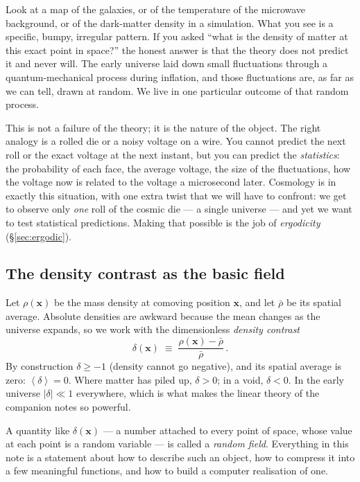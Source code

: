 \documentclass[12pt]{article}
\newcommand{\bx}{\mathbf{x}}
\newcommand{\avg}[1]{\left\langle #1 \right\rangle}
\begin{document}
Look at a map of the galaxies, or of the temperature of the microwave
background, or of the dark-matter density in a simulation.  What you see
is a specific, bumpy, irregular pattern.  If you asked ``what is the
density of matter at this exact point in space?'' the honest answer is
that the theory does not predict it and never will.  The early universe
laid down small fluctuations through a quantum-mechanical process during
inflation, and those fluctuations are, as far as we can tell, drawn at
random.  We live in one particular outcome of that random process.

This is not a failure of the theory; it is the nature of the object.
The right analogy is a rolled die or a noisy voltage on a wire.  You
cannot predict the next roll or the exact voltage at the next instant,
but you can predict the \emph{statistics}: the probability of each face,
the average voltage, the size of the fluctuations, how the voltage now
is related to the voltage a microsecond later.  Cosmology is in exactly
this situation, with one extra twist that we will have to confront: we
get to observe only \emph{one} roll of the cosmic die --- a single
universe --- and yet we want to test statistical predictions.  Making
that possible is the job of \emph{ergodicity} (\S\ref{sec:ergodic}).

\subsection{The density contrast as the basic field}

Let $\rho(\bx)$ be the mass density at comoving position $\bx$, and let
$\bar\rho$ be its spatial average.  Absolute densities are awkward
because the mean changes as the universe expands, so we work with the
dimensionless \emph{density contrast}
\begin{equation}
  \delta(\bx) \;\equiv\; \frac{\rho(\bx) - \bar\rho}{\bar\rho}\,.
  \label{eq:delta-def}
\end{equation}
By construction $\delta \ge -1$ (density cannot go negative), and its
spatial average is zero: $\avg{\delta} = 0$.  Where matter has piled up,
$\delta > 0$; in a void, $\delta < 0$.  In the early universe $|\delta|
\ll 1$ everywhere, which is what makes the linear theory of the
companion notes so powerful.

A quantity like $\delta(\bx)$ --- a number attached to every point of
space, whose value at each point is a random variable --- is called a
\emph{random field}.  Everything in this note is a statement about how
to describe such an object, how to compress it into a few meaningful
functions, and how to build a computer realisation of one.
\end{document}
